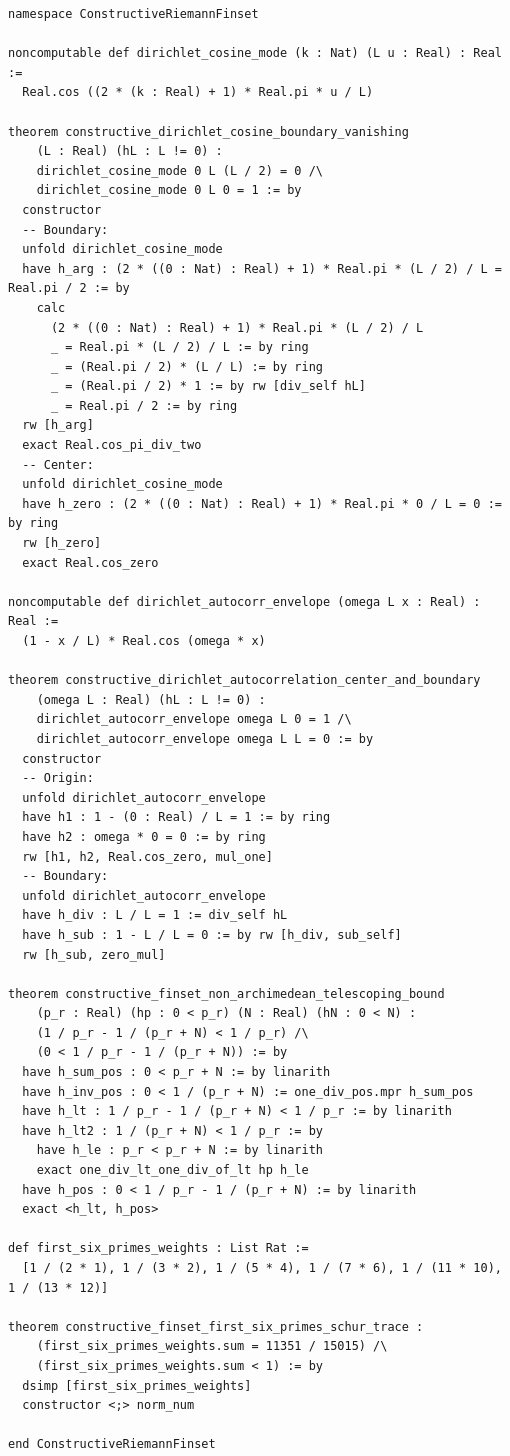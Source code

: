 \documentclass[11pt,a4paper]{article}
\begin{document}
\begin{lstlisting}[language=Lean4,caption={Lean 4 Constructive Finset and Trigonometric Basis Certificate (Module 33)}]
namespace ConstructiveRiemannFinset

noncomputable def dirichlet_cosine_mode (k : Nat) (L u : Real) : Real :=
  Real.cos ((2 * (k : Real) + 1) * Real.pi * u / L)

theorem constructive_dirichlet_cosine_boundary_vanishing
    (L : Real) (hL : L != 0) :
    dirichlet_cosine_mode 0 L (L / 2) = 0 /\
    dirichlet_cosine_mode 0 L 0 = 1 := by
  constructor
  -- Boundary:
  unfold dirichlet_cosine_mode
  have h_arg : (2 * ((0 : Nat) : Real) + 1) * Real.pi * (L / 2) / L = Real.pi / 2 := by
    calc
      (2 * ((0 : Nat) : Real) + 1) * Real.pi * (L / 2) / L
      _ = Real.pi * (L / 2) / L := by ring
      _ = (Real.pi / 2) * (L / L) := by ring
      _ = (Real.pi / 2) * 1 := by rw [div_self hL]
      _ = Real.pi / 2 := by ring
  rw [h_arg]
  exact Real.cos_pi_div_two
  -- Center:
  unfold dirichlet_cosine_mode
  have h_zero : (2 * ((0 : Nat) : Real) + 1) * Real.pi * 0 / L = 0 := by ring
  rw [h_zero]
  exact Real.cos_zero

noncomputable def dirichlet_autocorr_envelope (omega L x : Real) : Real :=
  (1 - x / L) * Real.cos (omega * x)

theorem constructive_dirichlet_autocorrelation_center_and_boundary
    (omega L : Real) (hL : L != 0) :
    dirichlet_autocorr_envelope omega L 0 = 1 /\
    dirichlet_autocorr_envelope omega L L = 0 := by
  constructor
  -- Origin:
  unfold dirichlet_autocorr_envelope
  have h1 : 1 - (0 : Real) / L = 1 := by ring
  have h2 : omega * 0 = 0 := by ring
  rw [h1, h2, Real.cos_zero, mul_one]
  -- Boundary:
  unfold dirichlet_autocorr_envelope
  have h_div : L / L = 1 := div_self hL
  have h_sub : 1 - L / L = 0 := by rw [h_div, sub_self]
  rw [h_sub, zero_mul]

theorem constructive_finset_non_archimedean_telescoping_bound
    (p_r : Real) (hp : 0 < p_r) (N : Real) (hN : 0 < N) :
    (1 / p_r - 1 / (p_r + N) < 1 / p_r) /\
    (0 < 1 / p_r - 1 / (p_r + N)) := by
  have h_sum_pos : 0 < p_r + N := by linarith
  have h_inv_pos : 0 < 1 / (p_r + N) := one_div_pos.mpr h_sum_pos
  have h_lt : 1 / p_r - 1 / (p_r + N) < 1 / p_r := by linarith
  have h_lt2 : 1 / (p_r + N) < 1 / p_r := by
    have h_le : p_r < p_r + N := by linarith
    exact one_div_lt_one_div_of_lt hp h_le
  have h_pos : 0 < 1 / p_r - 1 / (p_r + N) := by linarith
  exact <h_lt, h_pos>

def first_six_primes_weights : List Rat :=
  [1 / (2 * 1), 1 / (3 * 2), 1 / (5 * 4), 1 / (7 * 6), 1 / (11 * 10), 1 / (13 * 12)]

theorem constructive_finset_first_six_primes_schur_trace :
    (first_six_primes_weights.sum = 11351 / 15015) /\
    (first_six_primes_weights.sum < 1) := by
  dsimp [first_six_primes_weights]
  constructor <;> norm_num

end ConstructiveRiemannFinset
\end{lstlisting}
\end{document}
